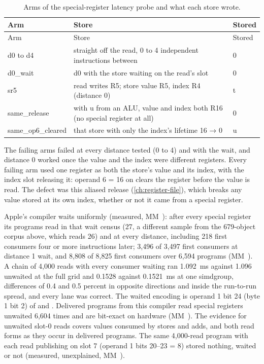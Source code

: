 \begin{xltabular}{\linewidth}{@{}>{\hsize}X>{\hsize}Xl@{}}
\caption{Arms of the special-register latency probe and what each store wrote.}\label{tab:sr-latency-arms}\\
\toprule
Arm & Store & Stored \\
\midrule
\endfirsthead
{}
\toprule
Arm & Store & Stored \\
\midrule
\endhead
d0 to d4 &  straight off the read, 0 to 4 independent instructions
between & 0 \\*
d0\_wait & d0 with the store waiting on the read's slot & 0 \\*
sr5 & read writes R5; store value R5, index R4 (distance 0) & t \\*
same\_release &  with u from an ALU, value and index both R16 (no special
register at all) & 0 \\*
same\_op6\_cleared & that store with only the index's lifetime 16
→ 0 & u \\*
\bottomrule
\end{xltabular}

The failing arms failed at every distance tested (0 to 4) and with the wait, and distance 0 worked once the value and the index were different
registers. Every failing arm used one register as both the store's value and its index, with the index slot releasing it:
operand 6 = 16 on  clears the register before the value is read. The defect was this aliased release
(\cref{ch:register-file}), which breaks any value stored at its own index, whether or not it came from a special register.

Apple's compiler waits uniformly (measured, MM~): after every special register its programs read in that wait
census (27, a different sample from the 679-object corpus above, which reads 26) and at every distance, including 218 first consumers four or more instructions later; 3,496 of 3,497 first consumers at distance 1
wait, and 8,808 of 8,825 first consumers over 6,594 programs (MM~). A chain of 4,000 reads with
every consumer waiting ran 1.092~ms against 1.096 unwaited at the full grid and 0.1528 against 0.1521~ms at one simdgroup,
differences of 0.4 and 0.5 percent in opposite directions and inside the run-to-run spread, and every lane was correct. The waited encoding is operand 1 bit 24 (byte 1 bit 2) of  and . Delivered programs from this compiler read special registers unwaited 6,604 times and are
bit-exact on hardware (MM~). The evidence for unwaited slot-0 reads covers  values consumed by
stores and adds, and both read forms as they occur in delivered programs. The same 4,000-read program with each read publishing on
slot 7 (operand 1 bits 20–23 = 8) stored nothing, waited or not (measured, unexplained, MM~).

